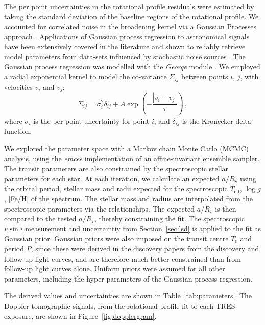 \documentclass[useAMS,usenatbib]{mn2e}
\begin{document}
The per point uncertainties in the rotational profile residuals were estimated by taking the standard deviation of the baseline regions of the rotational profile. We accounted for correlated noise in the broadening kernel via a Gaussian Processes approach \citep[e.g.][]{2015AJ....150..197H}. Applications of Gaussian process regression to astronomical signals have been extensively covered in the literature and shown to reliably retrieve model parameters from data-sets influenced by stochastic noise sources \citep[e.g.][]{2012MNRAS.419.2683G,2014MNRAS.445.3401G}. The Gaussian process regression was modelled with the \emph{George} module \citep{2014arXiv1403.6015A}. We employed a radial exponential kernel to model the co-variance $\Sigma_{ij}$ between points $i$, $j$, with velocities $v_{i}$ and $v_{j}$:
\begin{equation}
  \Sigma_{ij} = \sigma_{i}^2 \delta_{ij} + A \exp \left(- \frac{|v_{i}-v_{j}|}{\tau} \right)\,,
\end{equation}
where $\sigma_{i}$ is the per-point uncertainty for point $i$, and $\delta_{ij}$ is the Kronecker delta function.


We explored the parameter space with a Markov chain Monte Carlo (MCMC) analysis, using the \emph{emcee} implementation \citep{2013PASP..125..306F} of an affine-invariant ensemble sampler. The transit parameters are also constrained by the spectroscopic stellar parameters for each star. At each iteration, we calculate an expected $a/R_\star$ using the orbital period, stellar mass and radii expected for the spectroscopic $T_\text{eff}$, $\log g$, [Fe/H] of the spectrum. The stellar mass and radius are interpolated from the spectroscopic parameters via the \citet{2010A&amp;ARv..18...67T} relationships. The expected $a/R_\star$ is then compared to the tested $a/R_\star$, thereby constraining the fit. The spectroscopic $v \sin i$ measurement and uncertaintiy from Section~\ref{sec:lsd} is applied to the fit as Gaussian prior. Gaussian priors were also imposed on the transit centre $T_0$ and period $P$, since these were derived in the discovery papers from the discovery and follow-up light curves, and are therefore much better constrained than from follow-up light curves alone. Uniform priors were assumed for all other parameters, including the hyper-parameters of the Gaussian process regression. 

The derived values and uncertainties are shown in Table~\ref{tab:parameters}. The Doppler tomographic signals, from the rotational profile fit to each TRES exposure, are shown in Figure~\ref{fig:dopplergram}. 
\end{document}
